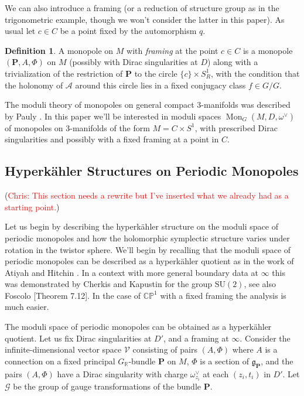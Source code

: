 \documentclass[11pt, oneside, reqno]{amsart}
\theoremstyle{definition} \newtheorem{definition}{Definition}[section]
\theoremstyle{definition} \newtheorem{remark}[definition]{Remark}
\theoremstyle{definition} \newtheorem{remarks}[definition]{Remarks}
\theoremstyle{definition} \newtheorem{question}[definition]{Question}
\theoremstyle{definition} \newtheorem*{note}{Note}
\theoremstyle{definition} \newtheorem{example}[definition]{Example}
\theoremstyle{definition} \newtheorem{examples}[definition]{Examples}
\renewcommand{\gg}{\mathfrak{g}}
\newcommand{\bb}[1]{\mathbb{#1}}
\newcommand{\mc}[1]{\mathcal{#1}}
\newcommand{\bo}[1]{\boldsymbol{#1}}
\newcommand{\RR}{\mathbb{R}}
\newcommand{\SU}{\mathrm{SU}}
\DeclareMathOperator{\mon}{Mon}
\newcommand{\chris}[1]{(\textcolor{red}{Chris: #1})}
\begin{document}
We can also introduce a framing (or a reduction of structure group as in the trigonometric example, though we won't consider the latter in this paper).  As usual let $c \in C$ be a point fixed by the automorphism $q$.

\begin{definition}
A monopole on $M$ with \emph{framing} at the point $c \in C$ is a monopole $(\bo P,A,\Phi)$ on $M$ (possibly with Dirac singularities at $D$) along with a trivialization of the restriction of $\bo P$ to the circle $\{c\} \times S^1_R$, with the condition that the holonomy of $\mc A$ around this circle lies in a fixed conjugacy class $f \in G/G$.
\end{definition}

The moduli theory of monopoles on general compact 3-manifolds was described by Pauly \cite{Pauly}.  In this paper we'll be interested in moduli spaces $\mon_G(M, D, \omega^\vee)$ of monopoles on 3-manifolds of the form $M = C \times S^1$, with prescribed Dirac singularities and possibly with a fixed framing at a point in $C$.  

\subsection{Hyperk\"ahler Structures on Periodic Monopoles} \label{HK_monopole_section}

\chris{This section needs a rewrite but I've inserted what we already had as a starting point.}

Let us begin by describing the hyperk\"ahler structure on the moduli space of periodic monopoles and how the holomorphic symplectic structure varies under rotation in the twistor sphere.  We'll begin by recalling that the moduli space of periodic monopoles can be described as a hyperk\"ahler quotient as in the work of Atiyah and Hitchin \cite{AtiyahHitchin}.  In a context with more general boundary data at $\infty$ this was demonstrated by Cherkis and Kapustin \cite{CherkisKapustin3} for the group $\SU(2)$, see also Foscolo \cite{FoscoloDef}[Theorem 7.12].  In the case of $\bb{CP}^1$ with a fixed framing the analysis is much easier.

The moduli space of periodic monopoles can be obtained as a hyperk\"ahler quotient.  Let us fix Dirac singularities at $D'$, and a framing at $\infty$.  Consider the infinite-dimensional vector space $\mc V$ consisting of pairs $(A,\Phi)$ where $A$ is a connection on a fixed principal $G_\RR$-bundle $\bo P$ on $M$, $\Phi$ is a section of $\gg_{\bo P}$, and the pairs $(A,\Phi)$ have a Dirac singularity with charge $\omega^\vee_{z_i}$ at each $(z_i,t_i)$ in $D'$.  Let $\mc G$ be the group of gauge transformations of the bundle $\bo P$.
\end{document}
